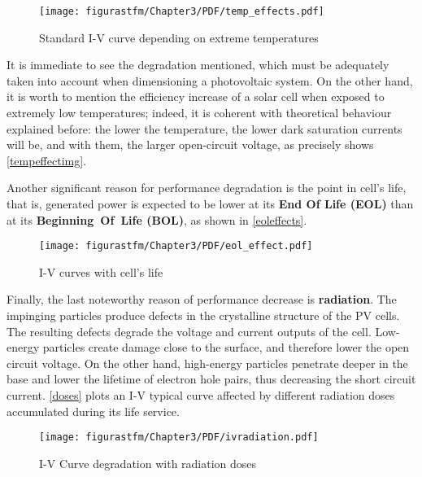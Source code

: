 \begin{figure} [H] 				
				\centering
				\texttt{[image: figurastfm/Chapter3/PDF/temp\_effects.pdf]}
				\caption{Standard I-V curve depending on extreme temperatures \cite{spacecraftspower}} \label{tempeffectimg}
			\end{figure}

	It is immediate to see the degradation mentioned, which must be adequately taken into account when dimensioning a photovoltaic system. On the other hand, it is worth to mention the efficiency increase of a solar cell when exposed to extremely low temperatures; indeed, it is coherent with theoretical behaviour explained before: the lower the temperature, the lower dark saturation currents will be, and with them, the larger open-circuit voltage, as precisely shows \autoref{tempeffectimg}.

Another significant reason for performance degradation is the point in cell's life, that is, generated power is expected to be lower at its \textbf{End Of Life (\acrshort{EOL})} than at its \textbf{Beginning~Of~Life (\acrshort{BOL})}, as shown in \autoref{eoleffects}.

\begin{figure} [H] 				
				\centering
				\texttt{[image: figurastfm/Chapter3/PDF/eol\_effect.pdf]}
				\caption{I-V curves with cell's life \cite{spacecraftspower}} \label{eoleffects}
			\end{figure}


Finally, the last noteworthy reason of performance decrease is \textbf{radiation}. The impinging particles produce defects in the crystalline structure of the PV cells. The resulting defects degrade the voltage and current outputs of the cell. Low-energy particles create damage close to the surface, and therefore lower the open circuit voltage. On the other hand, high-energy particles penetrate deeper in the base and lower the lifetime of electron hole pairs, thus decreasing the short circuit current. \autoref{doses} plots an I-V typical curve affected by different radiation doses accumulated during its life service.

\begin{figure} [H] 				
				\centering
				\texttt{[image: figurastfm/Chapter3/PDF/ivradiation.pdf]}
				\caption{I-V Curve degradation with radiation doses \cite{spacecraftspower}} \label{doses}
			\end{figure}

